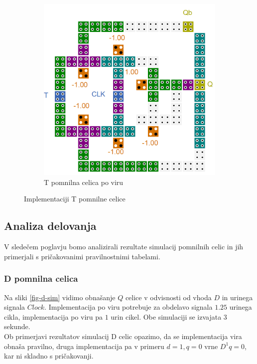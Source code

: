 \documentclass[a4paper, 11pt]{article}
\begin{document}
\begin{figure}[h!]
\begin{subfigure}[b]{0.4\textwidth}
	\includegraphics[width=\textwidth]{../img/vir_5/t.png} 
	\caption{T pomnilna celica po viru \cite{a_novel_approach}}
	\label{fig-t-2}
	\end{subfigure}
	\caption{Implementaciji T pomnilne celice}
	\label{fig-t}
\end{figure}


\subsection{Analiza delovanja}

V sledečem poglavju bomo analizirali rezultate simulacij pomnilnih celic in jih primerjali s pričakovanimi pravilnostnimi tabelami.\\

\subsubsection{D pomnilna celica}
Na sliki \ref{fig-d-sim} vidimo obnašanje $Q$ celice v odvisnosti od vhoda $D$ in urinega signala $Clock$.
Implementacija po viru \cite{quantum_dot} potrebuje za obdelavo signala $1.25$ urinega cikla, implementacija po viru \cite{a_novel_approach} pa $1$ urin cikel. Obe simulaciji se izvajata $3$ sekunde.\\
Ob primerjavi rezultatov simulacij D celic opazimo, da se implementacija vira \cite{quantum_dot} obnaša pravilno, druga implementacija pa v primeru $d=1, q=0$ vrne $D^1q=0$, kar ni skladno s pričakovanji.
\end{document}
